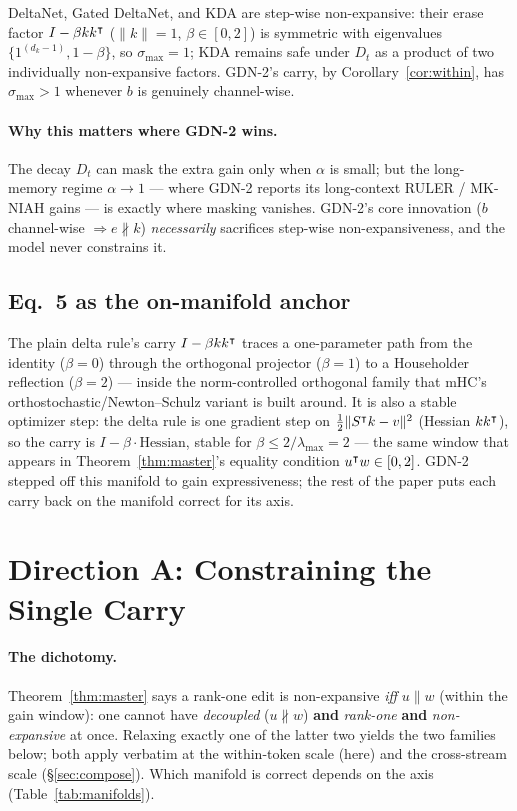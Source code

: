 \documentclass[11pt,letterpaper,logo]{yalearxiv}
\newcommand{\smax}{\sigma_{\max}}
\begin{document}
\begin{corollary}
\label{cor:safe}
DeltaNet, Gated DeltaNet, and KDA are step-wise non-expansive: their erase factor
$I - \beta k k^{\intercal}$ ($\|k\|=1$, $\beta \in [0,2]$) is symmetric with eigenvalues
$\{1^{(d_k-1)}, 1-\beta\}$, so $\smax = 1$; KDA remains safe under $D_t$ as a product of
two individually non-expansive factors. GDN-2's carry, by Corollary~\ref{cor:within}, has
$\smax > 1$ whenever $b$ is genuinely channel-wise.
\end{corollary}

\paragraph{Why this matters where GDN-2 wins.} The decay $D_t$ can mask the extra gain only
when $\alpha$ is small; but the long-memory regime $\alpha \to 1$ --- where GDN-2 reports
its long-context RULER / MK-NIAH gains --- is exactly where masking vanishes. GDN-2's core
innovation ($b$ channel-wise $\Rightarrow e \not\parallel k$) \emph{necessarily} sacrifices
step-wise non-expansiveness, and the model never constrains it.

\subsection{Eq.~5 as the on-manifold anchor}
The plain delta rule's carry $I - \beta k k^{\intercal}$ traces a one-parameter path from the
identity ($\beta=0$) through the orthogonal projector ($\beta=1$) to a Householder
reflection ($\beta=2$) --- inside the norm-controlled orthogonal family that mHC's
orthostochastic/Newton--Schulz variant is built around. It is also a stable optimizer step:
the delta rule is one gradient step on $\tfrac12\|S^{\intercal}k - v\|^2$ (Hessian $kk^{\intercal}$), so
the carry is $I - \beta\cdot\text{Hessian}$, stable for $\beta \le 2/\lambda_{\max} = 2$ ---
the same window that appears in Theorem~\ref{thm:master}'s equality condition
$u^{\intercal}w \in [0,2]$. GDN-2 stepped off this manifold to gain expressiveness; the rest of
the paper puts each carry back on the manifold correct for its axis.


\section{Direction A: Constraining the Single Carry}
\label{sec:dirA}

\paragraph{The dichotomy.} Theorem~\ref{thm:master} says a rank-one edit is non-expansive
\emph{iff} $u \parallel w$ (within the gain window): one cannot have \emph{decoupled}
($u \not\parallel w$) \textbf{and} \emph{rank-one} \textbf{and} \emph{non-expansive} at
once. Relaxing exactly one of the latter two yields the two families below; both apply
verbatim at the within-token scale (here) and the cross-stream scale
(\S\ref{sec:compose}). Which manifold is correct depends on the axis
(Table~\ref{tab:manifolds}).
\end{document}
